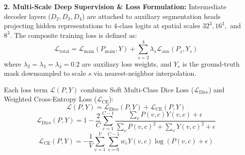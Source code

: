 \documentclass[conference]{IEEEtran}
\begin{document}
\textbf{2. Multi-Scale Deep Supervision \& Loss Formulation:} Intermediate decoder layers ($D_2, D_3, D_4$) are attached to auxiliary segmentation heads projecting hidden representations to 4-class logits at spatial scales $32^3, 16^3,$ and $8^3$. The composite training loss is defined as:
\begin{equation}
\mathcal{L}_{\text{total}} = \mathcal{L}_{\text{main}}(P_{\text{main}}, Y) + \sum_{s=2}^{4} \lambda_s \mathcal{L}_{\text{aux}}(P_s, Y_s)
\end{equation}
where $\lambda_2 = \lambda_3 = \lambda_4 = 0.2$ are auxiliary loss weights, and $Y_s$ is the ground-truth mask downsampled to scale $s$ via nearest-neighbor interpolation.

Each loss term $\mathcal{L}(P, Y)$ combines Soft Multi-Class Dice Loss ($\mathcal{L}_{\text{Dice}}$) and Weighted Cross-Entropy Loss ($\mathcal{L}_{\text{CE}}$):
\begin{equation}
\mathcal{L}(P, Y) = \mathcal{L}_{\text{Dice}}(P, Y) + \mathcal{L}_{\text{CE}}(P, Y)
\end{equation}
\begin{equation}
\mathcal{L}_{\text{Dice}}(P, Y) = 1 - \frac{2}{C} \sum_{c=1}^{C-1} \frac{\sum_{v} P(v, c) Y(v, c) + \epsilon}{\sum_{v} P(v, c)^2 + \sum_{v} Y(v, c)^2 + \epsilon}
\end{equation}
\begin{equation}
\mathcal{L}_{\text{CE}}(P, Y) = - \frac{1}{V} \sum_{v=1}^{V} \sum_{c=0}^{C-1} w_c Y(v, c) \log(P(v, c) + \epsilon)
\end{equation}
\end{document}
